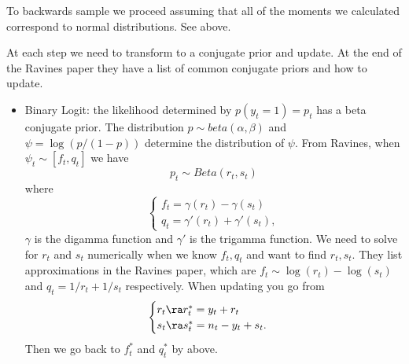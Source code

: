 \documentclass{article}
\begin{document}
To backwards sample we proceed assuming that all of the moments we calculated
correspond to normal distributions.  See above.

At each step we need to transform to a conjugate prior and update.  At the end
of the Ravines paper they have a list of common conjugate priors and how to
update.

\begin{itemize}

\item Binary Logit: the likelihood determined by $p(y_t = 1) = p_t$ has a beta
  conjugate prior.  The distribution $p \sim beta(\alpha, \beta)$ and $\psi =
  \log (p / (1-p))$ determine the distribution of $\psi$.  From Ravines, when
  $\psi_t \sim [f_t, q_t]$ we have
  \[
  p_t \sim Beta(r_t, s_t) 
  \]
  where
  \[
  \begin{cases}
    f_t = \gamma(r_t) - \gamma(s_t) \\
    q_t = \gamma'(r_t) + \gamma'(s_t),
  \end{cases}
  \]
  $\gamma$ is the digamma function and $\gamma'$ is the trigamma function.  We
  need to solve for $r_t$ and $s_t$ numerically when we know $f_t, q_t$ and want
  to find $r_t, s_t$.  They list approximations in the Ravines paper, which are
  $f_t \sim \log(r_t) - \log(s_t)$ and $q_t = 1/r_t + 1/s_t$ respectively.  When
  updating you go from
  \[
  \begin{cases}
    r_t \ra r_t^* = y_t + r_t \\
    s_t \ra s_t^* = n_t - y_t + s_t.
  \end{cases}
  \]
  Then we go back to $f_t^*$ and $q_t^*$ by above.


\end{itemize}
\end{document}
